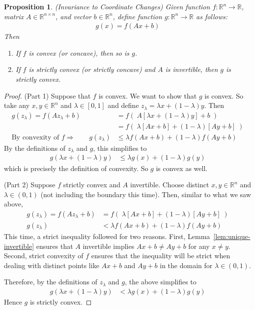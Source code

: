 \documentclass[12pt]{article}
\numberwithin{equation}{section} %
\theoremstyle{plain}
\newtheorem{prop}[thm]{Proposition}
\theoremstyle{definition}
\theoremstyle{remark}
\newcommand{\R}{\mathbb{R}}
\newcommand{\Rn}{\mathbb{R}^n}
\newcommand{\Rnn}{\mathbb{R}^{n\times n}}
\begin{document}
\begin{prop}{\emph{(Invariance to Coordinate Changes)}}
\label{prop:coordinvariance}
Given function $f:\Rn\rightarrow\R$, matrix $A\in\Rnn$, and vector
$b\in\Rn$, define function $g:\Rn\rightarrow\R$ as follows:
\begin{align*}
  g(x) = f(Ax+b)
\end{align*}
Then
\begin{enumerate}
  \item If $f$ is convex (or concave), then so is $g$.
  \item If $f$ is strictly convex (or strictly concave) and $A$ is
    invertible, then $g$ is strictly convex.
\end{enumerate}
\end{prop}
\begin{proof}
(Part 1)
Suppose that $f$ is convex. We want to show that $g$ is convex. So take
any $x,y\in\Rn$ and $\lambda\in[0,1]$ and define $z_\lambda =
\lambda x + (1-\lambda) y$. Then
\begin{align*}
  g(z_\lambda) =
  f(Az_\lambda + b)
  &= f\left( \;
    A\left[
      \lambda x + (1-\lambda) y
    \right]
    +b
  \; \right)\\
  &= f\left( \;
    \lambda \left[Ax + b\right]
    + (1-\lambda)
    \left[Ay + b\right]
  \; \right)\\
  \text{By convexity of $f$}\Rightarrow\qquad
  g(z_\lambda)
  &\leq \lambda f\left( Ax + b \right)
    + (1-\lambda)
    f\left( Ay + b \right)
\end{align*}
By the definitions of $z_\lambda$ and $g$, this simplifies to
\begin{align*}
  g(\lambda x + (1-\lambda)y)
  &\leq \lambda g(x)
    + (1-\lambda) g(y)
\end{align*}
which is precisely the definition of convexity. So $g$ is convex as
well.

(Part 2)
Suppose $f$ strictly convex and $A$ invertible. Choose distinct
$x,y\in\Rn$ and $\lambda\in(0,1)$ (not including the boundary this
time). Then, similar to what we saw above,
\begin{align*}
  g(z_\lambda) =
  f(Az_\lambda + b)
  &= f\left( \;
    \lambda \left[Ax + b\right]
    + (1-\lambda)
    \left[Ay + b\right]
  \; \right)\\
  g(z_\lambda)
  &< \lambda f\left( Ax + b \right)
    + (1-\lambda)
    f\left( Ay + b \right)
\end{align*}
This time, a strict inequality followed for two reasons. First,
Lemma~\ref{lem:unique-invertible} ensures that $A$ invertible implies
$Ax+b\neq Ay+b$ for any $x\neq y$. Second, strict convexity of $f$
ensures that the inequality will be strict when dealing with distinct
points like $Ax+b$ and $Ay+b$ in the domain for $\lambda\in(0,1)$.

Therefore, by the definitions of $z_\lambda$ and $g$, the above
simplifies to
\begin{align*}
  g(\lambda x + (1-\lambda)y)
  &< \lambda g(x)
    + (1-\lambda) g(y)
\end{align*}
Hence $g$ is strictly convex.
\end{proof}
\end{document}
